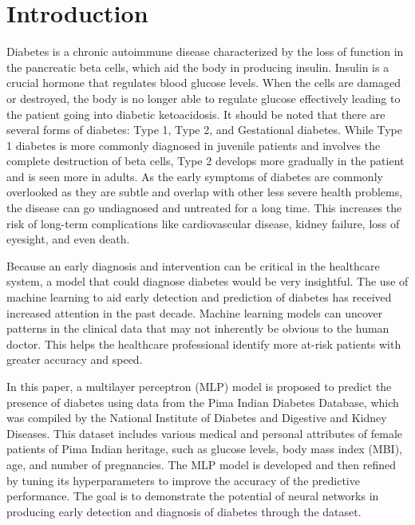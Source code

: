 \chapter{Introduction}

Diabetes is a chronic autoimmune disease characterized by the loss of function in the pancreatic beta cells, which aid the body in producing insulin. Insulin is a crucial hormone that regulates blood glucose levels. When the cells are damaged or destroyed, the body is no longer able to regulate glucose effectively leading to the patient going into diabetic ketoacidosis.  It should be noted that there are several forms of diabetes: Type 1, Type 2, and Gestational diabetes. While Type 1 diabetes is more commonly diagnosed in juvenile patients and involves the complete destruction of beta cells, Type 2 develops more gradually in the patient and is seen more in adults. As the early symptoms of diabetes are commonly overlooked as they are subtle and overlap with other less severe health problems, the disease can go undiagnosed and untreated for a long time. This increases the risk of long-term complications like cardiovascular disease, kidney failure, loss of eyesight, and even death. 

Because an early diagnosis and intervention can be critical in the healthcare system, a model that could diagnose diabetes would be very insightful. The use of machine learning to aid early detection and prediction of diabetes has received increased attention in the past decade. Machine learning models can uncover patterns in the clinical data that may not inherently be obvious to the human doctor. This helps the healthcare professional identify more at-risk patients with greater accuracy and speed. 

In this paper, a multilayer perceptron (MLP) model is proposed to predict the presence of diabetes using data from the Pima Indian Diabetes Database, which was compiled by the National Institute of Diabetes and Digestive and Kidney Diseases. This dataset includes various medical and personal attributes of female patients of Pima Indian heritage, such as glucose levels, body mass index (MBI), age, and number of pregnancies. The MLP model is developed and then refined by tuning its hyperparameters to improve the accuracy of the predictive performance. The goal is to demonstrate the potential of neural networks in producing early detection and diagnosis of diabetes through the dataset. 


